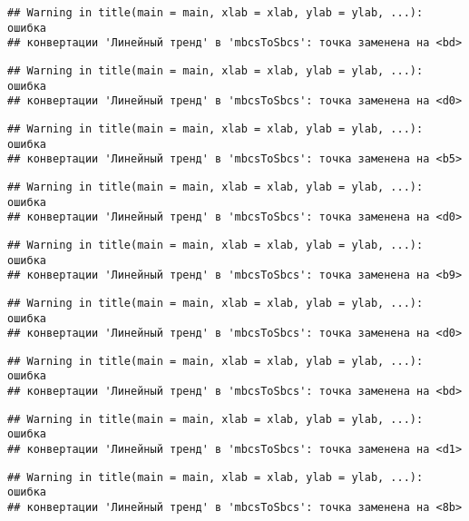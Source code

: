 \documentclass[
]{article}
\begin{document}
\begin{verbatim}
## Warning in title(main = main, xlab = xlab, ylab = ylab, ...): ошибка
## конвертации 'Линейный тренд' в 'mbcsToSbcs': точка заменена на <bd>
\end{verbatim}

\begin{verbatim}
## Warning in title(main = main, xlab = xlab, ylab = ylab, ...): ошибка
## конвертации 'Линейный тренд' в 'mbcsToSbcs': точка заменена на <d0>
\end{verbatim}

\begin{verbatim}
## Warning in title(main = main, xlab = xlab, ylab = ylab, ...): ошибка
## конвертации 'Линейный тренд' в 'mbcsToSbcs': точка заменена на <b5>
\end{verbatim}

\begin{verbatim}
## Warning in title(main = main, xlab = xlab, ylab = ylab, ...): ошибка
## конвертации 'Линейный тренд' в 'mbcsToSbcs': точка заменена на <d0>
\end{verbatim}

\begin{verbatim}
## Warning in title(main = main, xlab = xlab, ylab = ylab, ...): ошибка
## конвертации 'Линейный тренд' в 'mbcsToSbcs': точка заменена на <b9>
\end{verbatim}

\begin{verbatim}
## Warning in title(main = main, xlab = xlab, ylab = ylab, ...): ошибка
## конвертации 'Линейный тренд' в 'mbcsToSbcs': точка заменена на <d0>
\end{verbatim}

\begin{verbatim}
## Warning in title(main = main, xlab = xlab, ylab = ylab, ...): ошибка
## конвертации 'Линейный тренд' в 'mbcsToSbcs': точка заменена на <bd>
\end{verbatim}

\begin{verbatim}
## Warning in title(main = main, xlab = xlab, ylab = ylab, ...): ошибка
## конвертации 'Линейный тренд' в 'mbcsToSbcs': точка заменена на <d1>
\end{verbatim}

\begin{verbatim}
## Warning in title(main = main, xlab = xlab, ylab = ylab, ...): ошибка
## конвертации 'Линейный тренд' в 'mbcsToSbcs': точка заменена на <8b>
\end{verbatim}
\end{document}

